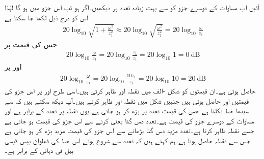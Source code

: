 آئیں اب مساوات  کے دوسرے جزو  کو  سے بہت زیادہ تعدد پر دیکھیں۔اگر  ہو تب اس جزو میں  ہو گا لہٰذا اس کو درج ذیل لکھا جا سکتا ہے
\begin{align*}
20\log_{10}\sqrt{1+\frac{\omega^2}{z_1^2}}\approx 20\log_{10}\sqrt{\frac{\omega^2}{z_1^2}}=20\log_{10}\frac{\omega}{z_1}
\end{align*}
جس کی قیمت  پر
\begin{align*}
20\log_{10}\frac{\omega}{z_1}=20\log_{10}\frac{z_1}{z_1}=20\log_{10}1=\SI{0}{\deci\bel}
\end{align*}
اور  پر 
\begin{align*}
20\log_{10}\frac{\omega}{z_1}=20\log_{10}\frac{10 z_1}{z_1}=20\log_{10}10=\SI{20}{\deci\bel}
\end{align*}
حاصل ہوتی ہے۔ان قیمتوں کو شکل -الف میں نقطہ  اور   ظاہر کرتی ہیں۔اسی طرح  اور  پر اس جزو کی قیمتیں  اور  حاصل ہوتی ہیں جنہیں شکل میں نقطہ  اور  ظاہر کرتے ہیں۔آپ دیکھ سکتے ہیں کہ  سے  سیدھا خط نکلتا ہے جس  کی قیمت  تعدد پر بڑھ کر  ہو جاتی ہے۔یوں نقطہ  پر تعدد  کے برابر ہے اور مساوات  کے دوسرے جزو کی قیمت  ہے۔تعدد دس گنا یعنی  کرنے سے  اس جزو کی قیمت  ہو جاتی ہے  جسے نقطہ  ظاہر کرتا ہے۔تعدد مزید دس گنا بڑھانے  سے  اس جزو کی قیمت مزید  بڑھ کر  ہو جاتی ہے جس سے نقطہ  حاصل ہوتا ہے۔ہم کہتے ہیں کہ  تعدد سے شروع ہوتے اس خط کی ڈھلوان بیس ڈیسی بیل فی دہائی کے برابر ہے۔
%
